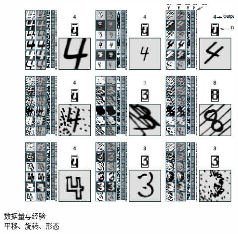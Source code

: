\documentclass{beamer}%
\begin{document}
\begin{frame}
    \begin{figure}
        \vspace{-0.2cm}  %
        \setlength{\belowcaptionskip}{-0.4cm}   %
        \setlength{\abovecaptionskip}{0.4cm}   %
        \centering%
        \hspace{0.05cm}\includegraphics[width=0.7\linewidth]{UnusualDistortionNoises.png}%
        \label{fig:fastdata}
    \end{figure}

    \vspace{0.2cm}

    数据量与经验\\
    平移、旋转、形态


\end{frame}
\end{document}
